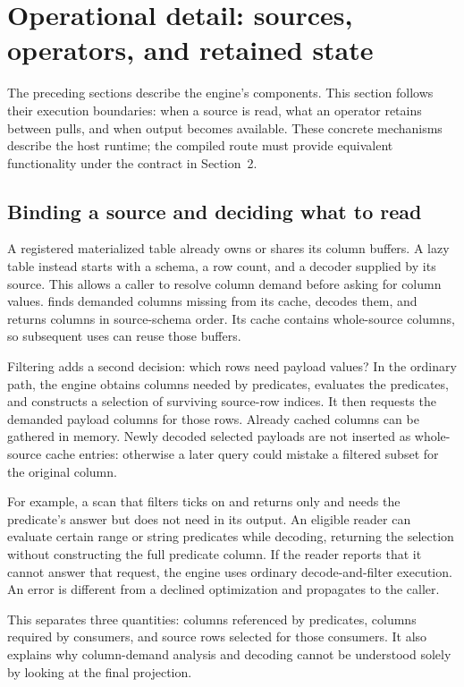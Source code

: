 \section{Operational detail: sources, operators, and retained state}
\label{sec:operations}
The preceding sections describe the engine's components. This section follows
their execution boundaries: when a source is read, what an operator retains
between pulls, and when output becomes available. These concrete mechanisms
describe the host runtime; the compiled route must provide equivalent
functionality under the contract in Section~2.

\subsection{Binding a source and deciding what to read}
A registered materialized table already owns or shares its column buffers.
A lazy table instead starts with a schema, a row count, and a decoder supplied
by its source. This allows a caller to resolve column demand before asking for
column values.  finds demanded columns missing from
its cache, decodes them, and returns columns in source-schema order. Its cache
contains whole-source columns, so subsequent uses can reuse those buffers.

Filtering adds a second decision: which rows need payload values? In the
ordinary  path, the engine obtains columns needed by
predicates, evaluates the predicates, and constructs a selection of surviving
source-row indices. It then requests the demanded payload columns for those
rows. Already cached columns can be gathered in memory. Newly decoded selected
payloads are not inserted as whole-source cache entries: otherwise a later
query could mistake a filtered subset for the original column.

For example, a scan that filters ticks on  and returns only
 and  needs the predicate's answer but does not need
 in its output. An eligible reader can evaluate certain range or
string predicates while decoding, returning the selection without constructing
the full predicate column. If the reader reports that it cannot answer that
request, the engine uses ordinary decode-and-filter execution. An error is
different from a declined optimization and propagates to the caller.

This separates three quantities: columns referenced by predicates, columns
required by consumers, and source rows selected for those consumers. It also
explains why column-demand analysis and decoding cannot be understood solely
by looking at the final projection.

